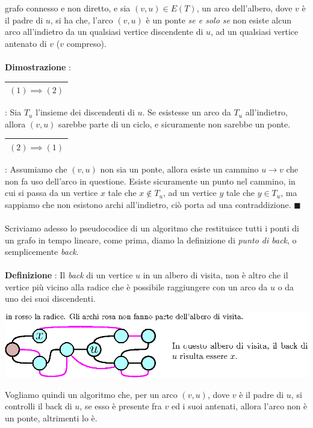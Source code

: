 \documentclass[12pt, letterpaper]{article}
\newcommand{\acc}{\\\hphantom{}\\}
\newcommand{\boxedMath}[1]{\begin{tabular}{|c|}\hline \texttt{#1} \\ \hline\end{tabular} :}
\begin{document}
grafo connesso e non diretto, e sia $(v,u)\in E(T)$, un arco dell'albero, dove $v$ è il padre di $u$, si ha che,
l'arco  $(v,u)$ è un ponte \textit{se e solo se} non esiste alcun arco all'indietro da un qualsiasi vertice
discendente di $u$, ad un qualsiasi vertice antenato di $v$ ($v$ compreso).\acc
\textbf{Dimostrazione} : \boxedMath{$(1)\implies(2)$} Sia $T_u$ l'insieme dei discendenti di $u$. Se esistesse un arco da  $T_u$ all'indietro,
allora $(v,u)$ sarebbe parte di un ciclo, e sicuramente non sarebbe un ponte. \boxedMath{$(2)\implies(1)$} Assumiamo che
$(v,u)$ non sia un ponte, allora esiste un cammino $u\rightarrow v$ che non fa uso dell'arco in questione. Esiste sicuramente
un punto nel cammino, in cui si passa da un vertice $x$ tale che $x\notin T_u$, ad un vertice $y$ tale che
$y\in T_u$, ma sappiamo che non esistono archi all'indietro, ciò porta ad una contraddizione. $\blacksquare$\acc
Scriviamo adesso lo pseudocodice di un algoritmo che restituisce tutti i ponti di un grafo in tempo lineare, come prima, diamo
la definizione di \textit{punto di back}, o semplicemente \textit{back}.\acc
\textbf{Definizione} : Il \textit{back} di un vertice $u$ in un albero di visita, non è altro che il vertice più
vicino alla radice che è possibile raggiungere con un arco da $u$ o da uno dei suoi discendenti.\begin{center}
    \includegraphics[width=1\textwidth ]{images/back.eps}
\end{center}
Vogliamo quindi un algoritmo che, per un arco $(v,u)$, dove $v$ è il padre di $u$, si controlli il
back di $u$, se esso è presente fra $v$ ed i suoi antenati, allora l'arco non è un ponte, altrimenti lo è.
\end{document}
